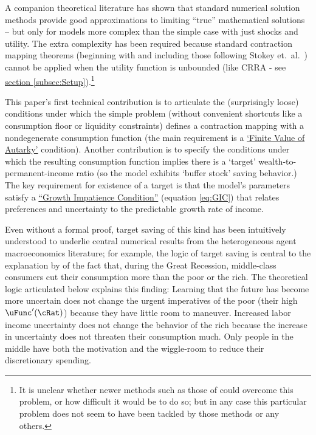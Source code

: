 \documentclass[BufferStockTheory]{subfiles}
\begin{document}
A companion theoretical literature has shown that standard numerical solution methods provide good approximations to limiting ``true'' mathematical solutions -- but only for models more complex than the simple case with just shocks and utility.  The extra complexity has been required because standard contraction mapping theorems (beginning with \cite{bellmanDynamicProgramming} and including those following Stokey et.~al.~\citeyearpar{slpMethods}) cannot be applied when the utility function is unbounded (like CRRA - see \hyperlink{DiffFromLit}{section \ref{subsec:Setup}}).\footnote{It is unclear whether newer methods such as those of \cite{mnUnique} could overcome this problem, or how difficult it would be to do so; but in any case this particular problem does not seem to have been tackled by those methods or any others.}

This paper's first technical contribution is to articulate the (surprisingly loose) conditions under which the simple problem (without convenient shortcuts like a consumption floor or liquidity constraints) defines a contraction mapping with a nondegenerate consumption function (the main requirement is a \hyperlink{FVAC}{`Finite Value of Autarky'} condition).  Another contribution is to specify the conditions under which the resulting consumption function implies there is a `target' wealth-to-permanent-income ratio (so the model exhibits `buffer stock' saving behavior.)  The key requirement for existence of a target is that the model's parameters satisfy a \hyperlink{GIC}{``Growth Impatience Condition''} (equation \eqref{eq:GIC}) that relates preferences and uncertainty to the predictable growth rate of income.

\hypertarget{KMP}{}

Even without a formal proof, target saving of this kind has been intuitively understood to underlie central numerical results from the heterogeneous agent macroeconomics literature; for example, the logic of target saving is central to the explanation by \cite{kmpHandbook} of the fact that, during the Great Recession, middle-class consumers cut their consumption more than the poor or the rich.  The theoretical logic articulated below explains this finding:  Learning that the future has become more uncertain does not change the urgent imperatives of the poor (their high $\uFunc^{\prime}(\cRat)$) because they have little room to maneuver.  Increased labor income uncertainty does not change the behavior of the rich because the increase in uncertainty does not threaten their consumption much.  Only people in the middle have both the motivation and the wiggle-room to reduce their discretionary spending.
\end{document}
